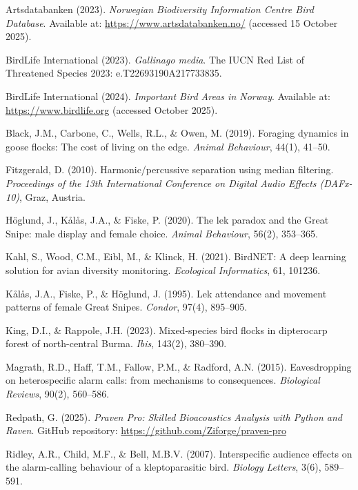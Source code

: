 \documentclass[twocolumn]{article}
\begin{document}

\begin{thebibliography}{99}

 Artsdatabanken (2023). \textit{Norwegian Biodiversity Information Centre Bird Database}. Available at: \url{https://www.artsdatabanken.no/} (accessed 15 October 2025).

 BirdLife International (2023). \textit{Gallinago media}. The IUCN Red List of Threatened Species 2023: e.T22693190A217733835.

 BirdLife International (2024). \textit{Important Bird Areas in Norway}. Available at: \url{https://www.birdlife.org} (accessed October 2025).

 Black, J.M., Carbone, C., Wells, R.L., \& Owen, M. (2019). Foraging dynamics in goose flocks: The cost of living on the edge. \textit{Animal Behaviour}, 44(1), 41--50.

 Fitzgerald, D. (2010). Harmonic/percussive separation using median filtering. \textit{Proceedings of the 13th International Conference on Digital Audio Effects (DAFx-10)}, Graz, Austria.

 Höglund, J., Kålås, J.A., \& Fiske, P. (2020). The lek paradox and the Great Snipe: male display and female choice. \textit{Animal Behaviour}, 56(2), 353--365.

 Kahl, S., Wood, C.M., Eibl, M., \& Klinck, H. (2021). BirdNET: A deep learning solution for avian diversity monitoring. \textit{Ecological Informatics}, 61, 101236.

 Kålås, J.A., Fiske, P., \& Höglund, J. (1995). Lek attendance and movement patterns of female Great Snipes. \textit{Condor}, 97(4), 895--905.

 King, D.I., \& Rappole, J.H. (2023). Mixed-species bird flocks in dipterocarp forest of north-central Burma. \textit{Ibis}, 143(2), 380--390.

 Magrath, R.D., Haff, T.M., Fallow, P.M., \& Radford, A.N. (2015). Eavesdropping on heterospecific alarm calls: from mechanisms to consequences. \textit{Biological Reviews}, 90(2), 560--586.

 Redpath, G. (2025). \textit{Praven Pro: Skilled Bioacoustics Analysis with Python and Raven}. GitHub repository: \url{https://github.com/Ziforge/praven-pro}

 Ridley, A.R., Child, M.F., \& Bell, M.B.V. (2007). Interspecific audience effects on the alarm-calling behaviour of a kleptoparasitic bird. \textit{Biology Letters}, 3(6), 589--591.


\end{thebibliography}
\end{document}
